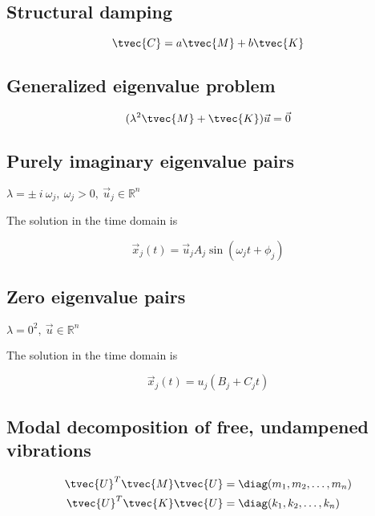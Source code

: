\documentclass[10pt,a4paper]{scrartcl}
\begin{document}
\begin{multicols*}{2}
\subsection{Structural damping}

\begin{equation*}
\tvec{C}=a\tvec{M}+b\tvec{K}
\end{equation*}

\subsection{Generalized eigenvalue problem}

\begin{equation*}
(\lambda^2\tvec{M}+\tvec{K})\vec{u}=\vec{0}
\end{equation*}

\subsection{Purely imaginary eigenvalue pairs}

$\lambda=\pm\ i\ \omega_j,\ \omega_j>0,\ \vec{u}_j\in\mathbb{R}^n$

The solution in the time domain is

\begin{equation*}
\vec{x}_j(t)=\vec{u}_jA_j\sin(\omega_j t+\phi_j)
\end{equation*}

\subsection{Zero eigenvalue pairs} 

$ \lambda = 0^2,\ \vec{u}\in\mathbb{R}^n $

The solution in the time domain is

\begin{equation*}
\vec{x}_j(t)=u_j(B_j+C_jt)
\end{equation*}

\subsection{Modal decomposition of free, undampened vibrations}

\begin{align}
\tvec{U}^T\tvec{M}\tvec{U}&=\diag(m_1,m_2,\ldots,m_n)\\
\tvec{U}^T\tvec{K}\tvec{U}&=\diag(k_1,k_2,\ldots,k_n)
\end{align}


\end{multicols*}
\end{document}

